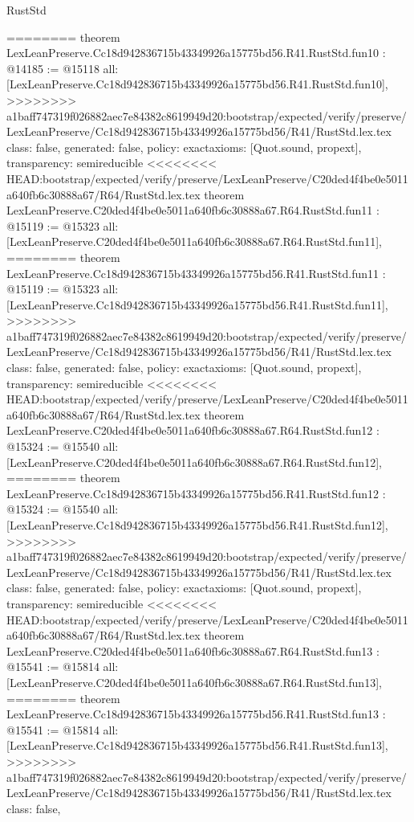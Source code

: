 \begin{lexlean}{RustStd}
\begin{coremodule}
{\begin{coremodule}
{{{{{{{{{{{{{========
theorem LexLeanPreserve.Cc18d942836715b43349926a15775bd56.R41.RustStd.fun10 : @14185 := @15118 {
  all: [LexLeanPreserve.Cc18d942836715b43349926a15775bd56.R41.RustStd.fun10],
>>>>>>>> a1baff747319f026882aec7e84382c8619949d20:bootstrap/expected/verify/preserve/LexLeanPreserve/Cc18d942836715b43349926a15775bd56/R41/RustStd.lex.tex
  class: false,
  generated: false,
  policy: exact{axioms: [Quot.sound, propext]},
  transparency: semireducible
}
<<<<<<<< HEAD:bootstrap/expected/verify/preserve/LexLeanPreserve/C20ded4f4be0e5011a640fb6c30888a67/R64/RustStd.lex.tex
theorem LexLeanPreserve.C20ded4f4be0e5011a640fb6c30888a67.R64.RustStd.fun11 : @15119 := @15323 {
  all: [LexLeanPreserve.C20ded4f4be0e5011a640fb6c30888a67.R64.RustStd.fun11],
========
theorem LexLeanPreserve.Cc18d942836715b43349926a15775bd56.R41.RustStd.fun11 : @15119 := @15323 {
  all: [LexLeanPreserve.Cc18d942836715b43349926a15775bd56.R41.RustStd.fun11],
>>>>>>>> a1baff747319f026882aec7e84382c8619949d20:bootstrap/expected/verify/preserve/LexLeanPreserve/Cc18d942836715b43349926a15775bd56/R41/RustStd.lex.tex
  class: false,
  generated: false,
  policy: exact{axioms: [Quot.sound, propext]},
  transparency: semireducible
}
<<<<<<<< HEAD:bootstrap/expected/verify/preserve/LexLeanPreserve/C20ded4f4be0e5011a640fb6c30888a67/R64/RustStd.lex.tex
theorem LexLeanPreserve.C20ded4f4be0e5011a640fb6c30888a67.R64.RustStd.fun12 : @15324 := @15540 {
  all: [LexLeanPreserve.C20ded4f4be0e5011a640fb6c30888a67.R64.RustStd.fun12],
========
theorem LexLeanPreserve.Cc18d942836715b43349926a15775bd56.R41.RustStd.fun12 : @15324 := @15540 {
  all: [LexLeanPreserve.Cc18d942836715b43349926a15775bd56.R41.RustStd.fun12],
>>>>>>>> a1baff747319f026882aec7e84382c8619949d20:bootstrap/expected/verify/preserve/LexLeanPreserve/Cc18d942836715b43349926a15775bd56/R41/RustStd.lex.tex
  class: false,
  generated: false,
  policy: exact{axioms: [Quot.sound, propext]},
  transparency: semireducible
}
<<<<<<<< HEAD:bootstrap/expected/verify/preserve/LexLeanPreserve/C20ded4f4be0e5011a640fb6c30888a67/R64/RustStd.lex.tex
theorem LexLeanPreserve.C20ded4f4be0e5011a640fb6c30888a67.R64.RustStd.fun13 : @15541 := @15814 {
  all: [LexLeanPreserve.C20ded4f4be0e5011a640fb6c30888a67.R64.RustStd.fun13],
========
theorem LexLeanPreserve.Cc18d942836715b43349926a15775bd56.R41.RustStd.fun13 : @15541 := @15814 {
  all: [LexLeanPreserve.Cc18d942836715b43349926a15775bd56.R41.RustStd.fun13],
>>>>>>>> a1baff747319f026882aec7e84382c8619949d20:bootstrap/expected/verify/preserve/LexLeanPreserve/Cc18d942836715b43349926a15775bd56/R41/RustStd.lex.tex
  class: false,
}}}}}}}}}}}}}}}}}
\end{coremodule}}
\end{coremodule}
\end{lexlean}
